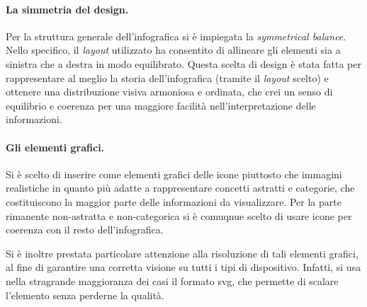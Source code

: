 \paragraph{La simmetria del design.} Per la struttura generale dell'infografica si è impiegata la \emph{symmetrical balance}.
Nello specifico, il \emph{layout} utilizzato ha consentito di allineare gli elementi sia a sinistra che a destra in modo equilibrato. 
Questa scelta di design è stata fatta per rappresentare al meglio la storia dell'infografica (tramite il \emph{layout} scelto) e ottenere una distribuzione visiva armoniosa e ordinata,
che crei un senso di equilibrio e coerenza per una maggiore facilità nell'interpretazione delle informazioni.

\paragraph{Gli elementi grafici.} Si è scelto di inserire come elementi grafici delle icone piuttosto che immagini realistiche in quanto più adatte a rappresentare concetti astratti e categorie, che costituiscono la maggior parte 
delle informazioni da visualizzare. Per la parte rimanente non-astratta e non-categorica si è comuqnue scelto di usare icone per coerenza con il resto dell'infografica.

Si è inoltre prestata particolare attenzione alla risoluzione di tali elementi grafici, al fine di garantire una corretta visione su tutti i tipi di dispositivo.
Infatti, si usa nella stragrande maggioranza dei casi il formato \gls{svg}, che permette di scalare l'elemento senza perderne la qualità.

